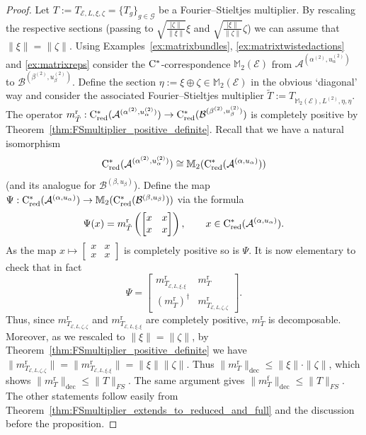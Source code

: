 \documentclass[11 pt, leqno]{amsart}
\numberwithin{equation}{section}
\theoremstyle{plain}
\theoremstyle{definition}
\newcommand{\Mat}{\mathbb M} %
\DeclareMathOperator{\red}{red}%
\DeclareMathOperator{\rd}{r}%
\DeclareMathOperator{\f}{f}%
\newcommand{\B}{\mathcal B}
\newcommand{\m}{m}
\newcommand{\G}{\mathcal G} %
\newcommand{\EE}{\mathcal E}
\newcommand{\x}{\widetilde x}
\newcommand{\A}{\mathcal A}
\newcommand{\cst}{\ifmmode\mathrm{C}^*\else{$\mathrm{C}^*$}\fi}
\begin{document}
\begin{proof}
Let $T := T_{\EE,L,\xi,\zeta} = \{ T_g \}_{g\in \G}$ be a Fourier--Stieltjes multiplier. 
By rescaling the respective sections (passing to $\sqrt{\frac{|\zeta\|}{\|\xi\|}}\xi$ and $\sqrt{\frac{|\xi\|}{\|\zeta\|}}\zeta$) we can assume that $\|\xi\|=\|\zeta\|$. 
Using Examples~\ref{ex:matrixbundles}, \ref{ex:matrixtwistedactions} and \ref{ex:matrixreps} consider the $\cst$-correspondence $\Mat_2(\EE)$ from $\A^{(\alpha^{(2)},u_{\alpha}^{(2)})}$ to $\B^{(\beta^{(2)},u_{\beta}^{(2)})}$. 
Define the section $\eta:=\xi \oplus \zeta \in \Mat_2(\EE)$ in the obvious `diagonal' way and consider the associated Fourier--Stieltjes multiplier $\tilde{T} := T_{\Mat_2(\EE), L^{(2)},\eta, \eta}$. 
The operator $m_{\tilde{T}}^{\rd} : \cst_{\red}(\A^{(\alpha^{(2)} , u_{\alpha}^{(2)})}) \to \cst_{\red}(\B^{(\beta^{(2)},u_{\beta}^{(2)})}) $ is completely positive by Theorem~\ref{thm:FSmultiplier_positive_definite}. 
Recall that we have a natural isomorphism
\[ 
    \cst_{\red}( \A^{(\alpha^{(2)},u_{\alpha}^{(2)})} ) \cong \Mat_2( \cst_{\red}(\A^{(\alpha,u_{\alpha})}) )
\]
(and its analogue for $\B^{(\beta,u_{\beta})}$). 
Define the map $\Psi: \cst_{\red}(\A^{(\alpha,u_{\alpha})}) \to \Mat_2(\cst_{\red}(\B^{(\beta,u_{\beta})}))$ via the formula
\[
    \Psi(x) = m_{\tilde{T}}^{\rd} \left( \begin{bmatrix}x & x \\x & x \end{bmatrix} \right), \qquad x \in \cst_{\red}(\A^{(\alpha,u_{\alpha})}). 
\]
As the map $x \mapsto \begin{bmatrix}x & x \\x & x \end{bmatrix} $ is completely positive so is $\Psi$. 
It is now elementary to check that in fact 
\[
    \Psi = \begin{bmatrix} 
                m_{T_{\EE, L, \xi, \xi}}^{\rd} & m_T^{\rd} \\ 
                ({m_T^{\rd}})^\dagger  & m_{T_{\EE, L, \zeta, \zeta}}^{\rd}
            \end{bmatrix} . 
\]
Thus, since  $m_{T_{\EE, L, \zeta, \zeta}}^{\rd}$ and $m_{T_{\EE, L, \xi, \xi}}^{\rd}$  are completely positive, $m_T^{\rd}$ is decomposable.
Moreover, as we rescaled to $\| \xi \| = \| \zeta \|$, by Theorem~\ref{thm:FSmultiplier_positive_definite} we have $\| m_{T_{\EE, L, \zeta, \zeta}}^{\rd} \| = \| m_{T_{\EE, L, \xi, \xi}}^{\rd} \| = \| \xi \| \|\zeta\|$. 
Thus $\| m_T^{\rd} \|_{\mathrm{dec}} \leq \| \xi \| \cdot \|\zeta\|$, which shows $\|\m_T^{\rd}\|_{\mathrm{dec}} \leq \|T\|_{FS}$. 
The same argument gives $\|\m_T^{\f}\|_{\mathrm{dec}} \leq \|T\|_{FS}$. 
The other statements follow easily from Theorem~\ref{thm:FSmultiplier_extends_to_reduced_and_full} and the discussion before the proposition.
\end{proof}
\end{document}
